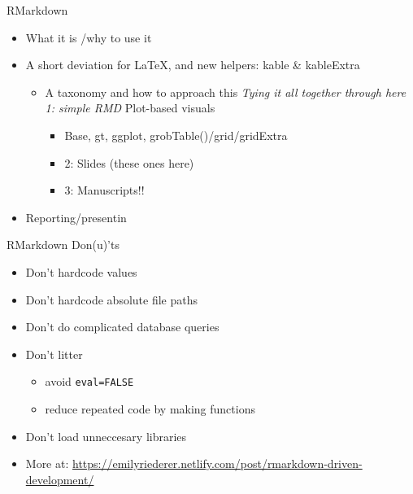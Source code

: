\documentclass[
  ignorenonframetext,
]{beamer}
\providecommand{\tightlist}{%
  \setlength{\itemsep}{0pt}\setlength{\parskip}{0pt}}
\begin{document}
\begin{frame}{RMarkdown}
\protect\hypertarget{rmarkdown}{}

\begin{itemize}
\tightlist
\item
  What it is /why to use it
\item
  A short deviation for LaTeX, and new helpers: kable \& kableExtra

  \begin{itemize}
  \tightlist
  \item
    A taxonomy and how to approach this \emph{Tying it all together
    through here 1: simple RMD }Plot-based visuals

    \begin{itemize}
    \tightlist
    \item
      Base, gt, ggplot, grobTable()/grid/gridExtra
    \item
      2: Slides (these ones here)
    \item
      3: Manuscripts!!
    \end{itemize}
  \end{itemize}
\item
  Reporting/presentin
\end{itemize}

\end{frame}

\begin{frame}[fragile]{RMarkdown Don(u)'ts}
\protect\hypertarget{rmarkdown-donuts}{}

\begin{itemize}
\tightlist
\item
  Don't hardcode values
\item
  Don't hardcode absolute file paths
\item
  Don't do complicated database queries
\item
  Don't litter

  \begin{itemize}
  \tightlist
  \item
    avoid \texttt{eval=FALSE}
  \item
    reduce repeated code by making functions
  \end{itemize}
\item
  Don't load unneccesary libraries
\item
  More at:
  \url{https://emilyriederer.netlify.com/post/rmarkdown-driven-development/}
\end{itemize}

\end{frame}
\end{document}
